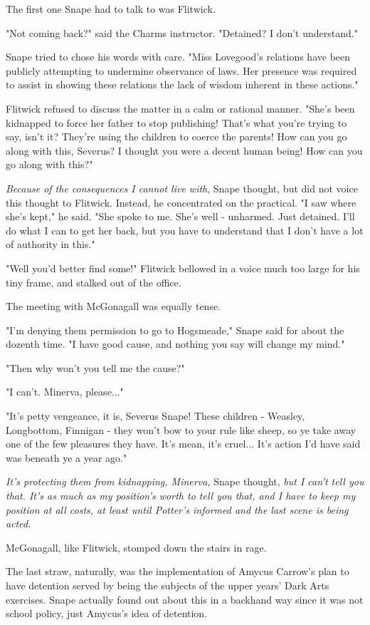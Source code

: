 The first one Snape had to talk to was Flitwick.

"Not coming back?" said the Charms instructor. "Detained? I don't understand."

Snape tried to chose his words with care. "Miss Lovegood's relations have been publicly attempting to undermine observance of laws. Her presence was required to assist in showing these relations the lack of wisdom inherent in these actions."

Flitwick refused to discuss the matter in a calm or rational manner. "She's been kidnapped to force her father to stop publishing! That's what you're trying to say, isn't it? They're using the children to coerce the parents! How can you go along with this, Severus? I thought you were a decent human being! How can you go along with this?"

\emph{Because of the consequences I cannot live with}, Snape thought, but did not voice this thought to Flitwick. Instead, he concentrated on the practical. "I saw where she's kept," he said. "She spoke to me. She's well - unharmed. Just detained. I'll do what I can to get her back, but you have to understand that I don't have a lot of authority in this."

"Well you'd better find some!" Flitwick bellowed in a voice much too large for his tiny frame, and stalked out of the office.

The meeting with McGonagall was equally tense.

"I'm denying them permission to go to Hogsmeade," Snape said for about the dozenth time. "I have good cause, and nothing you say will change my mind."

"Then why won't you tell me the cause?"

"I can't. Minerva, please..."

"It's petty vengeance, it is, Severus Snape! These children - Weasley, Longbottom, Finnigan - they won't bow to your rule like sheep, so ye take away one of the few pleasures they have. It's mean, it's cruel... It's action I'd have said was beneath ye a year ago."

\emph{It's protecting them from kidnapping, Minerva,} Snape thought, \emph{but I can't tell you that. It's as much as my position's worth to tell you that, and I have to keep my position at all costs, at least until Potter's informed and the last scene is being acted.}

McGonagall, like Flitwick, stomped down the stairs in rage.

The last straw, naturally, was the implementation of Amycus Carrow's plan to have detention served by being the subjects of the upper years' Dark Arts exercises. Snape actually found out about this in a backhand way since it was not school policy, just Amycus's idea of detention.

